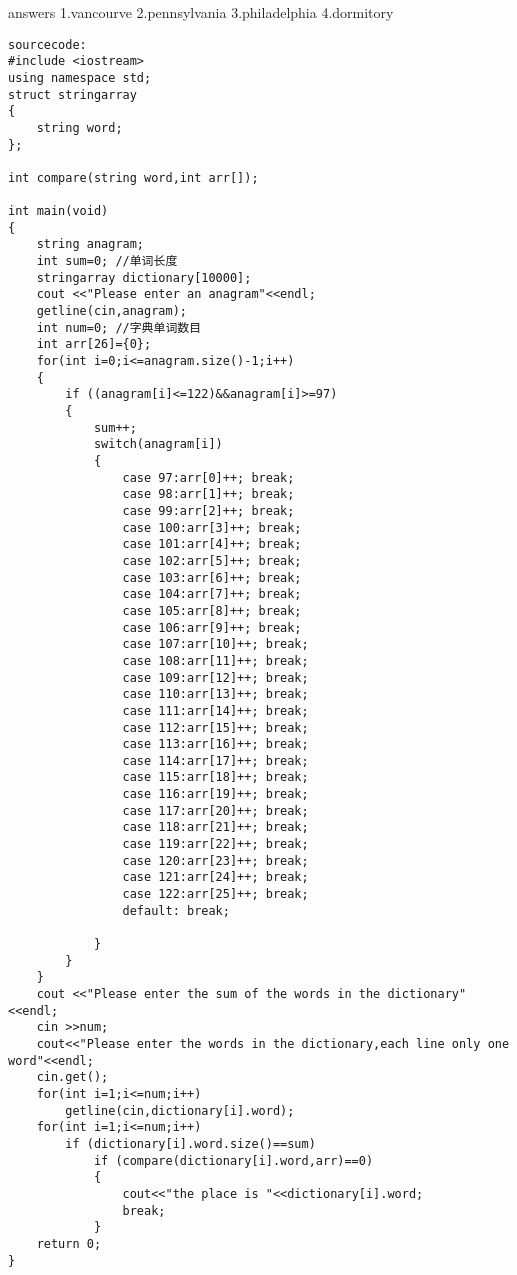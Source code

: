 \documentclass[11pt, a4paper, UTF8]{ctexart}
\begin{document}
\begin{solution}

answers 1.vancourve 2.pennsylvania 3.philadelphia 4.dormitory



\begin{verbatim}
sourcecode:
#include <iostream>
using namespace std;
struct stringarray
{
    string word;
};

int compare(string word,int arr[]);

int main(void)
{
    string anagram;
    int sum=0; //单词长度
    stringarray dictionary[10000];
    cout <<"Please enter an anagram"<<endl;
    getline(cin,anagram);
    int num=0; //字典单词数目
    int arr[26]={0};
    for(int i=0;i<=anagram.size()-1;i++)
    {
        if ((anagram[i]<=122)&&anagram[i]>=97)
        {
            sum++;
            switch(anagram[i])
            {
                case 97:arr[0]++; break;
                case 98:arr[1]++; break;
                case 99:arr[2]++; break;
                case 100:arr[3]++; break;
                case 101:arr[4]++; break;
                case 102:arr[5]++; break;
                case 103:arr[6]++; break;
                case 104:arr[7]++; break;
                case 105:arr[8]++; break;
                case 106:arr[9]++; break;
                case 107:arr[10]++; break;
                case 108:arr[11]++; break;
                case 109:arr[12]++; break;
                case 110:arr[13]++; break;
                case 111:arr[14]++; break;
                case 112:arr[15]++; break;
                case 113:arr[16]++; break;
                case 114:arr[17]++; break;
                case 115:arr[18]++; break;
                case 116:arr[19]++; break;
                case 117:arr[20]++; break;
                case 118:arr[21]++; break;
                case 119:arr[22]++; break;
                case 120:arr[23]++; break;
                case 121:arr[24]++; break;
                case 122:arr[25]++; break;
                default: break;

            }
        }
    }
    cout <<"Please enter the sum of the words in the dictionary"<<endl;
    cin >>num;
    cout<<"Please enter the words in the dictionary,each line only one word"<<endl;
    cin.get();
    for(int i=1;i<=num;i++)
        getline(cin,dictionary[i].word);
    for(int i=1;i<=num;i++)
        if (dictionary[i].word.size()==sum)
            if (compare(dictionary[i].word,arr)==0)
            {
                cout<<"the place is "<<dictionary[i].word;
                break;
            }
    return 0;
}


\end{verbatim}
\end{solution}
\end{document}
